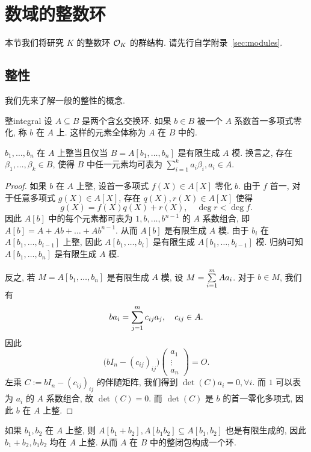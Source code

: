 \section{数域的整数环}
\label{ring of intergers}
本节我们将研究 $K$ 的整数环 ${\mathcal{O}}_K$ 的群结构. 请先行自学附录~\ref{sec:modules}.

\subsection{整性}
我们先来了解一般的整性的概念.
\begin{definition}{整}{integral}
设 $A\subseteq B$ 是两个含幺交换环. 如果 $b\in B$ 被一个 $A$ 系数首一多项式零化, 称 $b$ 在 $A$ 上. 这样的元素全体称为 $A$ 在 $B$ 中的.
\end{definition}

\begin{proposition}{}{}
$b_1,\dots,b_n$ 在 $A$ 上整当且仅当 $B=A[b_1,\dots,b_n]$ 是有限生成 $A$ 模.
换言之, 存在 $\beta_1,\dots,\beta_k\in B$, 使得 $B$ 中任一元素均可表为 $\sum_{i=1}^k a_i\beta_i,a_i\in A$.
\end{proposition}
\begin{proof}
如果 $b$ 在 $A$ 上整, 设首一多项式 $f(X)\in A[X]$ 零化 $b$. 由于 $f$ 首一, 对于任意多项式 $g(X)\in A[X]$, 存在 $q(X),r(X)\in A[X]$ 使得
	\[g(X)=f(X)q(X)+r(X),\quad \deg r< \deg f.\]
因此 $A[b]$ 中的每个元素都可表为 $1,b,\dots,b^{n-1}$ 的 $A$ 系数组合, 即 $A[b]=A+Ab+\dots+Ab^{n-1}$. 从而 $A[b]$ 是有限生成 $A$ 模. 由于 $b_i$ 在 $A[b_1,\dots,b_{i-1}]$ 上整, 因此 $A[b_1,\dots,b_i]$ 是有限生成 $A[b_1,\dots,b_{i-1}]$ 模. 归纳可知 $A[b_1,\dots,b_n]$ 是有限生成 $A$ 模.

反之, 若 $M=A[b_1,\dots,b_n]$ 是有限生成 $A$ 模, 设 $M=\sum\limits_{i=1}^m A a_i$. 对于 $b\in M$, 我们有
	\[b a_i=\sum\limits_{j=1}^m c_{ij} a_j,\quad c_{ij}\in A.\]
因此 
	\[\bigl(bI_n-(c_{ij})_{ij}\bigr)\begin{pmatrix}
		a_1\\ \vdots \\ a_n 
	\end{pmatrix}=O.\]
左乘 $C:=bI_n-(c_{ij})_{ij}$ 的伴随矩阵, 我们得到 $\det(C)a_i=0,\forall i$. 而 $1$ 可以表为 $a_i$ 的 $A$ 系数组合, 故 $\det(C)=0$. 而 $\det(C)$ 是 $b$ 的首一零化多项式, 因此 $b$ 在 $A$ 上整.
\end{proof}

如果 $b_1,b_2$ 在 $A$ 上整, 则 $A[b_1+b_2],A[b_1b_2]\subseteq A[b_1,b_2]$ 也是有限生成的, 因此 $b_1+b_2,b_1b_2$ 均在 $A$ 上整.
从而 $A$ 在 $B$ 中的整闭包构成一个环.


